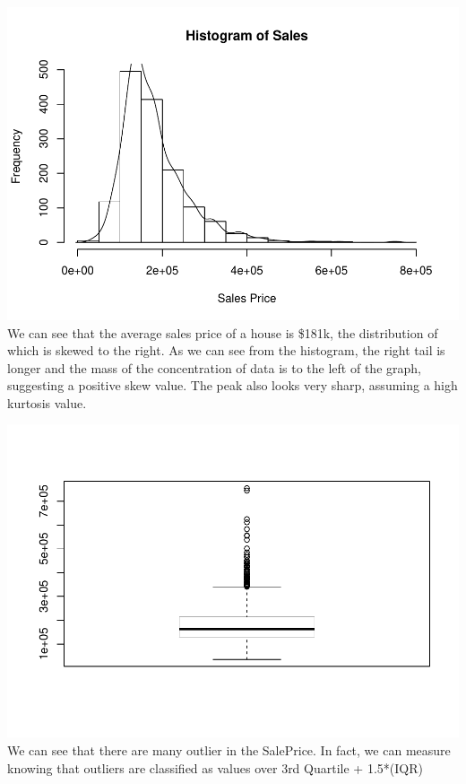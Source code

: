 \documentclass[]{article}
\newenvironment{Shaded}{\begin{snugshade}}{\end{snugshade}}
\newcommand{\KeywordTok}[1]{\textcolor[rgb]{0.13,0.29,0.53}{\textbf{#1}}}
\newcommand{\OperatorTok}[1]{\textcolor[rgb]{0.81,0.36,0.00}{\textbf{#1}}}
\newcommand{\NormalTok}[1]{#1}
\begin{document}
\includegraphics{EDA_files/figure-latex/unnamed-chunk-3-2.pdf} We can
see that the average sales price of a house is \$181k, the distribution
of which is skewed to the right. As we can see from the histogram, the
right tail is longer and the mass of the concentration of data is to the
left of the graph, suggesting a positive skew value. The peak also looks
very sharp, assuming a high kurtosis value.

\begin{Shaded}
\end{Shaded}

\includegraphics{EDA_files/figure-latex/unnamed-chunk-4-1.pdf} We can
see that there are many outlier in the SalePrice. In fact, we can
measure knowing that outliers are classified as values over 3rd Quartile
+ 1.5*(IQR)
\end{document}
